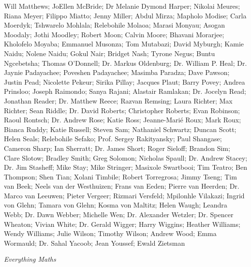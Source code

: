 Will Matthews; JoEllen McBride; Dr Melanie Dymond Harper; Nikolai Meures; Riana Meyer; Filippo Miatto; Jenny
Miller; Abdul Mirza; Mapholo Modise; Carla Moerdyk; Tshwarelo Mohlala; Relebohile Molaoa; Marasi Monyau;
Asogan Moodaly; Jothi Moodley; Robert Moon; Calvin Moore; Bhavani Morarjee; Kholofelo Moyaba; Emmanuel
Musonza; Tom Mutabazi; David Myburgh; Kamie Naidu; Nolene Naidu; Gokul Nair; Bridget Nash; Tyrone Negus;
Buntu Ngcebetsha; Thomas O’Donnell; Dr. Markus Oldenburg; Dr. William P. Heal; Dr. Jaynie Padayachee; Poveshen
Padayachee; Masimba Paradza; Dave Pawson; Justin Pead; Nicolette Pekeur; Sirika Pillay; Jacques Plaut; Barry
Povey; Andrea Prinsloo; Joseph Raimondo; Sanya Rajani; Alastair Ramlakan; Dr. Jocelyn Read; Jonathan Reader; Dr.
Matthew Reece; Razvan Remsing; Laura Richter; Max Richter; Sean Riddle; Dr. David Roberts; Christopher Roberts;
Evan Robinson; Raoul Rontsch; Dr. Andrew Rose; Katie Ross; Jeanne-Marié Roux; Mark Roux; Bianca Ruddy; Katie
Russell; Steven Sam; Nathaniel Schwartz; Duncan Scott; Helen Seals; Relebohile Sefako; Prof. Sergey Rakityansky;
Paul Shangase; Cameron Sharp; Ian Sherratt; Dr. James Short; Roger Sieloff; Brandon Sim; Clare Slotow; Bradley
Smith; Greg Solomon; Nicholas Spaull; Dr. Andrew Stacey; Dr. Jim Stasheff; Mike Stay; Mike Stringer; Masixole
Swartbooi; Tim Teatro; Ben Thompson; Shen Tian; Xolani Timbile; Robert Torregrosa; Jimmy Tseng; Tim van Beek;
Neels van der Westhuizen; Frans van Eeden; Pierre van Heerden; Dr. Marco van Leeuwen; Pieter Vergeer; Rizmari
Versfeld; Mpilonhle Vilakazi; Ingrid von Glehn; Tamara von Glehn; Kosma von Maltitz; Helen Waugh; Leandra Webb;
Dr. Dawn Webber; Michelle Wen; Dr. Alexander Wetzler; Dr. Spencer Wheaton; Vivian White; Dr. Gerald Wigger;
Harry Wiggins; Heather Williams; Wendy Williams; Julie Wilson; Timothy Wilson; Andrew Wood; Emma Wormauld;
Dr. Sahal Yacoob; Jean Youssef; Ewald Zietsman








\newpage
\thispagestyle{empty}

{\normalfont\sffamily\fontsize{22}\normalfont\itshape Everything Maths} \par

